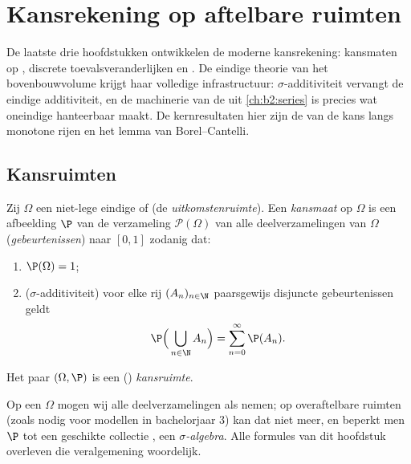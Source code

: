 \chapter{Kansrekening op aftelbare ruimten}\label{ch:b2:proba}

De laatste drie hoofdstukken ontwikkelen de moderne kansrekening:
kansmaten op  , discrete
toevalsveranderlijken en . De eindige theorie
van het bovenbouwvolume krijgt haar volledige infrastructuur:
$\sigma$-additiviteit vervangt de eindige additiviteit, en de
machinerie van de  uit \cref{ch:b2:series} is
precies wat oneindige  hanteerbaar maakt. De
kernresultaten hier zijn de  van de kans langs monotone
rijen  en het lemma van Borel--Cantelli.

\section{Kansruimten}

\begin{definition}\label{def:b2:proba:space}
Zij $\Omega$ een niet-lege eindige of  (de
\emph{uitkomstenruimte}). Een
\emph{kansmaat} op $\Omega$ is een afbeelding $\P$
van de verzameling $\mathcal{P}(\Omega)$ van alle
deelverzamelingen van $\Omega$
(\emph{gebeurtenissen}) naar $[0, 1]$ zodanig
dat:
\begin{enumerate}
\item $\P(\Omega) = 1$;
\item ($\sigma$-additiviteit) voor elke rij $(A_n)_{n\in\N}$
paarsgewijs disjuncte gebeurtenissen geldt
\[
\P\Bigl(\,\bigcup_{n \in \N} A_n\Bigr)
= \sum_{n=0}^{\infty} \P(A_n) .
\]
\end{enumerate}
Het paar $(\Omega, \P)$ is een ()
\emph{kansruimte}.
\end{definition}

\begin{remark}
Op een  $\Omega$ mogen wij alle deelverzamelingen als
 nemen; op overaftelbare ruimten (zoals nodig voor
 modellen in bachelorjaar 3) kan dat niet meer, en beperkt
men $\P$ tot een geschikte collectie , een
\emph{$\sigma$-algebra}. Alle formules van dit hoofdstuk overleven
die veralgemening woordelijk.
\end{remark}

